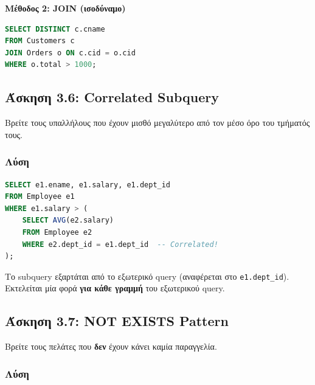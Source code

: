 \textbf{Μέθοδος 2: JOIN (ισοδύναμο)}

\begin{lstlisting}[language=SQL]
SELECT DISTINCT c.cname
FROM Customers c
JOIN Orders o ON c.cid = o.cid
WHERE o.total > 1000;
\end{lstlisting}

\subsection{Άσκηση 3.6: Correlated Subquery}

\begin{formulabox}[Εκφώνηση]
Βρείτε τους υπαλλήλους που έχουν μισθό μεγαλύτερο από τον μέσο όρο του τμήματός τους.
\end{formulabox}

\subsubsection*{Λύση}

\begin{lstlisting}[language=SQL]
SELECT e1.ename, e1.salary, e1.dept_id
FROM Employee e1
WHERE e1.salary > (
    SELECT AVG(e2.salary)
    FROM Employee e2
    WHERE e2.dept_id = e1.dept_id  -- Correlated!
);
\end{lstlisting}

\begin{infobox}
Το subquery εξαρτάται από το εξωτερικό query (αναφέρεται στο \texttt{e1.dept\_id}).
Εκτελείται μία φορά \textbf{για κάθε γραμμή} του εξωτερικού query.
\end{infobox}

\subsection{Άσκηση 3.7: NOT EXISTS Pattern}

\begin{formulabox}[Εκφώνηση]
Βρείτε τους πελάτες που \textbf{δεν} έχουν κάνει καμία παραγγελία.
\end{formulabox}

\subsubsection*{Λύση}

